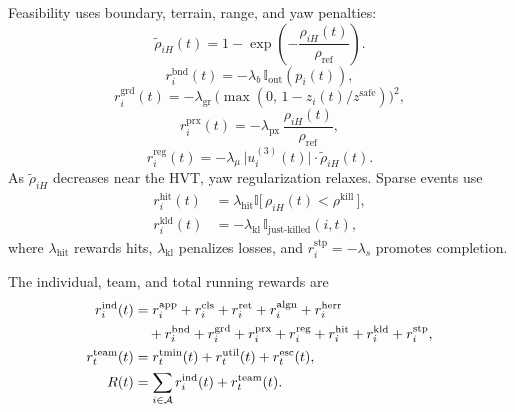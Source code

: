 \documentclass{cja}
\begin{document}
Feasibility uses boundary, terrain, range, and yaw penalties:
\begin{equation}
\widetilde\rho_{iH}(t)
=
1-
\exp\!\left(-\frac{\rho_{iH}(t)}{\rho_{\mathrm{ref}}}\right).
\end{equation}
\begin{equation}
r_i^{\mathrm{bnd}}(t)=-\lambda_b\,\mathbb{I}_{\mathrm{out}}(p_i(t)),
\label{eq:r-bnd}
\end{equation}
\begin{equation}
r_i^{\mathrm{grd}}(t)=-\lambda_{\mathrm{gr}}\,\bigl(\max(0,\,1-z_i(t)/z^{\mathrm{safe}})\bigr)^{2},
\label{eq:r-grd}
\end{equation}
\begin{equation}
r_i^{\mathrm{prx}}(t)=-\lambda_{\mathrm{px}}\,\frac{\rho_{iH}(t)}{\rho_{\mathrm{ref}}},
\label{eq:r-prx}
\end{equation}
\begin{equation}
r_i^{\mathrm{reg}}(t)=-\lambda_{\mu}\,\bigl|u_i^{(3)}(t)\bigr|\cdot \widetilde\rho_{iH}(t).
\label{eq:r-reg}
\end{equation}
As $\widetilde\rho_{iH}$ decreases near the HVT, yaw regularization relaxes. Sparse events use
\begin{equation}
\begin{aligned}
r_i^{\mathrm{hit}}(t)
&=\lambda_{\mathrm{hit}}\mathbb{I}\bigl[\,\rho_{iH}(t)<\rho^{\mathrm{kill}}\,\bigr],\\
r_i^{\mathrm{kld}}(t)
&=-\lambda_{\mathrm{kl}}\,\mathbb{I}_{\text{just-killed}}(i,t),
\end{aligned}
\label{eq:r-event}
\end{equation}
where $\lambda_{\mathrm{hit}}$ rewards hits, $\lambda_{\mathrm{kl}}$ penalizes losses, and $r_i^{\mathrm{stp}}=-\lambda_s$ promotes completion.

The individual, team, and total running rewards are
\begin{align}
r_i^{\mathrm{ind}}(t)
&=r_i^{\mathrm{app}}+r_i^{\mathrm{cls}}+r_i^{\mathrm{ret}}
+r_i^{\mathrm{algn}}+r_i^{\mathrm{herr}}\notag\\
&\quad+r_i^{\mathrm{bnd}}+r_i^{\mathrm{grd}}+r_i^{\mathrm{prx}}+r_i^{\mathrm{reg}}
+r_i^{\mathrm{hit}}+r_i^{\mathrm{kld}}+r_i^{\mathrm{stp}},
\label{eq:r-ind}\\
r_t^{\mathrm{team}}(t)
&=r_t^{\mathrm{tmin}}(t)+r_t^{\mathrm{util}}(t)+r_t^{\mathrm{esc}}(t),\\
R(t)
&=\sum_{i\in\mathcal A}r_i^{\mathrm{ind}}(t)+r_t^{\mathrm{team}}(t).
\label{eq:r-total}
\end{align}
\end{document}
